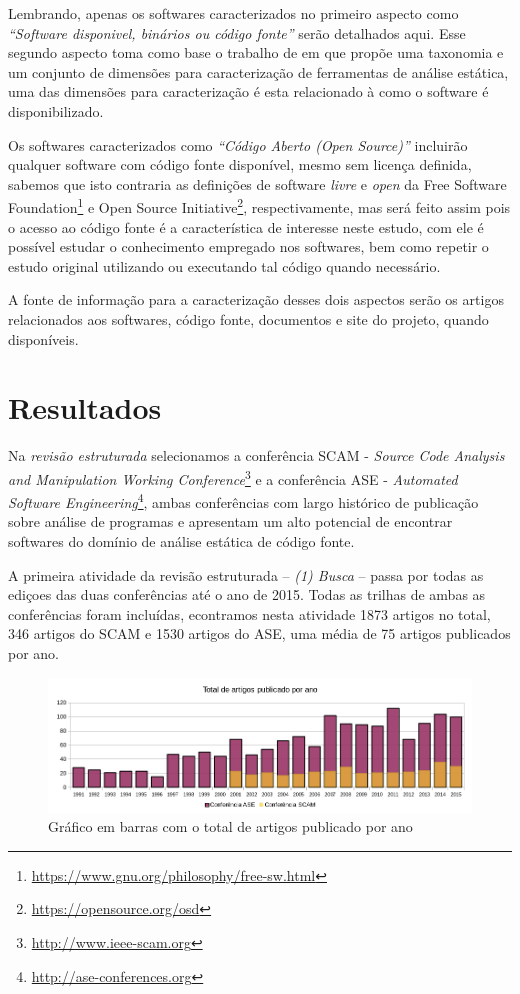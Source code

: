 Lembrando, apenas os softwares caracterizados no primeiro aspecto como
{\it``Software disponivel, binários ou código fonte''} serão detalhados aqui.
Esse segundo aspecto toma como base o trabalho de  em que
propõe uma taxonomia e um conjunto de dimensões para caracterização de
ferramentas de análise estática, uma das dimensões para caracterização
é esta relacionado à como o software é disponibilizado.

Os softwares caracterizados como {\it ``Código Aberto (Open Source)''}
incluirão qualquer software com código fonte disponível, mesmo sem licença
definida, sabemos que isto contraria as definições de software {\it livre} e
{\it open} da Free Software
Foundation\footnote{\url{https://www.gnu.org/philosophy/free-sw.html}} e Open
Source Initiative\footnote{\url{https://opensource.org/osd}}, respectivamente,
mas será feito assim pois o acesso ao código fonte é a característica de
interesse neste estudo, com ele é possível estudar o conhecimento empregado nos
softwares, bem como repetir o estudo original utilizando ou executando tal
código quando necessário.

A fonte de informação para a caracterização desses dois aspectos serão os
artigos relacionados aos softwares, código fonte, documentos e site do projeto,
quando disponíveis.

\section{Resultados}

Na {\it revisão estruturada} selecionamos a conferência SCAM - {\it
Source Code Analysis and Manipulation Working
Conference}\footnote{\url{http://www.ieee-scam.org}} e a conferência ASE - {\it
Automated Software Engineering}\footnote{\url{http://ase-conferences.org}},
ambas conferências com largo histórico de publicação sobre análise de
programas e apresentam um alto potencial de encontrar softwares do domínio de
análise estática de código fonte.

A primeira atividade da revisão estruturada -- {\it (1) Busca} -- passa por
todas as ediçoes das duas conferências até o ano de 2015. Todas as trilhas de
ambas as conferências foram incluídas, econtramos nesta atividade 1873 artigos
no total, 346 artigos do SCAM e 1530 artigos do ASE, uma média de 75 artigos
publicados por ano.

\begin{figure}[h]
  \center
  \includegraphics[scale=0.65]{imagens/grafico-artigos-por-ano.png}
  \caption{Gráfico em barras com o total de artigos publicado por ano}
  \label{grafico-artigos-por-ano}
\end{figure}

